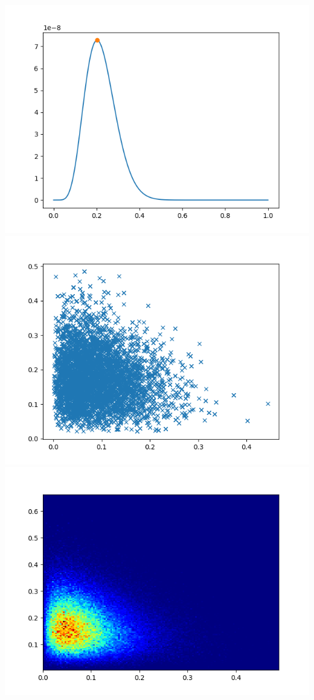 \documentclass[pt12]{article}
\begin{document}
\newpage

\begin{center}
\includegraphics[scale=0.5]{hip2.png}\\
\includegraphics[scale=0.5]{sc2.png}\\
\includegraphics[scale=0.5]{den2.png}\\
\end{center}
\end{document}
